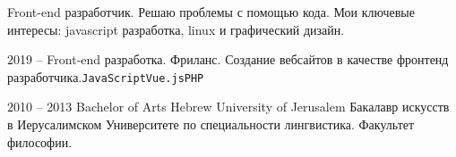 \documentclass[9pt]{developercv} %
\begin{document}
\vspace{0.5cm}



\begin{minipage}[t]{0.4\textwidth} %
	\vspace{-\baselineskip} %
	
  Front-end разработчик. Решаю проблемы с помощью кода.	
  Мои ключевые интересы: javascript разработка, linux и графический дизайн.
\end{minipage}
\hfill %
\begin{minipage}[t]{0.5\textwidth} %
	\vspace{-\baselineskip} %
	\begin{barchart}{5.5}
	\end{barchart}
\end{minipage}



\begin{entrylist}
\entry
		{2019 -- }
		{Front-end разработка. Фриланс.}
		{Создание вебсайтов в качестве фронтенд разработчика.\texttt{JavaScript}\slashsep\texttt{Vue.js}\slashsep\texttt{PHP}}
\end{entrylist}



\begin{entrylist}
\entry
    {2010 -- 2013}
		{Bachelor of Arts}
		{Hebrew University of Jerusalem}
		{Бакалавр искусств в Иерусалимском Университете по специальности лингвистика. Факультет философии.}
\end{entrylist}
\end{document}
